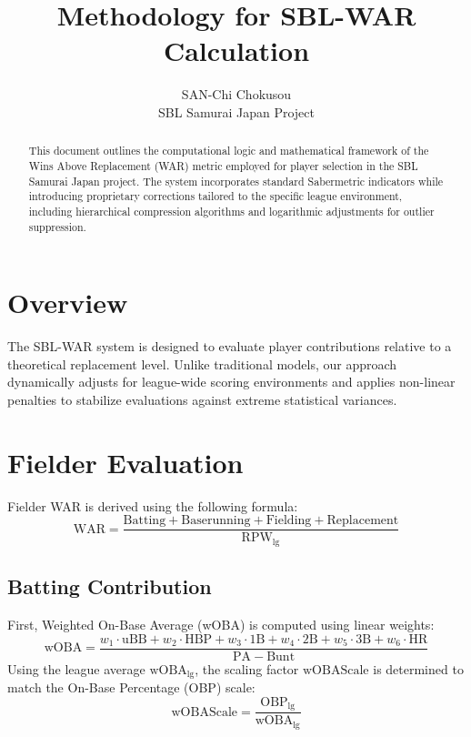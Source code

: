 \documentclass[uplatex,a4paper,11pt,dvipdfmx]{jsarticle}
\title{\textbf{Methodology for SBL-WAR Calculation}}
\author{SAN-Chi Chokusou \\ SBL Samurai Japan Project}
\date{\EnToday}
\newcommand{\mvar}[1]{\mathrm{#1}}
\begin{document}
\maketitle

\begin{abstract}
This document outlines the computational logic and mathematical framework of the Wins Above Replacement (WAR) metric employed for player selection in the SBL Samurai Japan project. The system incorporates standard Sabermetric indicators while introducing proprietary corrections tailored to the specific league environment, including hierarchical compression algorithms and logarithmic adjustments for outlier suppression.
\end{abstract}

\section{Overview}
The SBL-WAR system is designed to evaluate player contributions relative to a theoretical replacement level. Unlike traditional models, our approach dynamically adjusts for league-wide scoring environments and applies non-linear penalties to stabilize evaluations against extreme statistical variances.

\section{Fielder Evaluation}
Fielder WAR is derived using the following formula:
\begin{equation}
\mvar{WAR} = \frac{\mvar{Batting} + \mvar{Baserunning} + \mvar{Fielding} + \mvar{Replacement}}{\mvar{RPW}_{\text{lg}}}
\end{equation}

\subsection{Batting Contribution}
First, Weighted On-Base Average (wOBA) is computed using linear weights:
\begin{equation}
\mvar{wOBA} = \frac{w_1 \cdot \mvar{uBB} + w_2 \cdot \mvar{HBP} + w_3 \cdot \mvar{1B} + w_4 \cdot \mvar{2B} + w_5 \cdot \mvar{3B} + w_6 \cdot \mvar{HR}}{\mvar{PA} - \mvar{Bunt}}
\end{equation}
Using the league average $\mvar{wOBA}_{\text{lg}}$, the scaling factor $\mvar{wOBAScale}$ is determined to match the On-Base Percentage (OBP) scale:
\begin{equation}
\mvar{wOBAScale} = \frac{\mvar{OBP}_{\text{lg}}}{\mvar{wOBA}_{\text{lg}}}
\end{equation}
\end{document}

